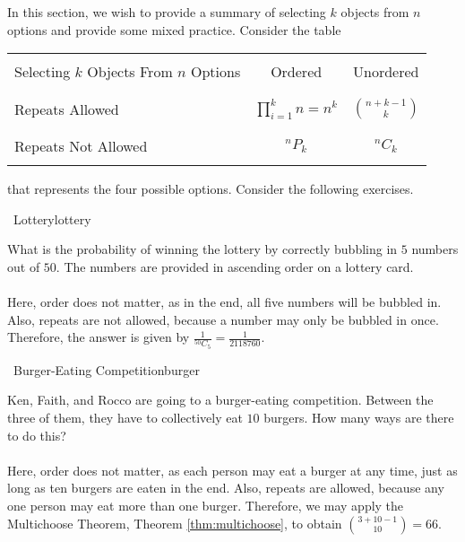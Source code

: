         In this section, we wish to provide a summary of selecting \(k\) objects from \(n\) options and provide some mixed practice. Consider the table
        \begin{center}
            \begin{tabular}{l||c|c}
                \hline
                & & \\
                Selecting \(k\) Objects From \(n\) Options & Ordered & Unordered \\
                & & \\
                \hline
                \hline
                & & \\
                Repeats Allowed & \(\prod_{i=1}^k n=n^k\) & \(\binom{n+k-1}{k}\) \\
                & & \\
                \hline
                & & \\
                Repeats Not Allowed & \(^nP_k\) & \(^nC_k\) \\
                & & \\
                \hline
            \end{tabular}
        \end{center}
        that represents the four possible options. Consider the following exercises.
        \begin{exercise}{\Difficulty\,\Difficulty\,\,Lottery}{lottery}
        
            What is the probability of winning the lottery by correctly bubbling in \(5\) numbers out of \(50\). The numbers are provided in ascending order on a lottery card. 
            \\
            \\
            Here, order does not matter, as in the end, all five numbers will be bubbled in. Also, repeats are not allowed, because a number may only be bubbled in once. Therefore, the answer is given by \(\frac{1}{^{50}C_5}=\frac{1}{2118760}\).
        
        \end{exercise}
        \begin{exercise}{\Difficulty\,\Difficulty\,\,Burger-Eating Competition}{burger}
        
            Ken, Faith, and Rocco are going to a burger-eating competition. Between the three of them, they have to collectively eat \(10\) burgers. How many ways are there to do this?
            \\
            \\
            Here, order does not matter, as each person may eat a burger at any time, just as long as ten burgers are eaten in the end. Also, repeats are allowed, because any one person may eat more than one burger. Therefore, we may apply the Multichoose Theorem, Theorem \ref{thm:multichoose}, to obtain \(\binom{3+10-1}{10}=66\).
        
        \end{exercise}
        
